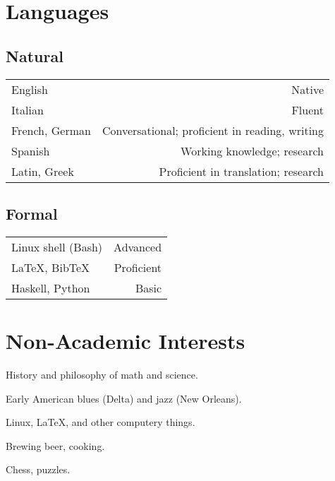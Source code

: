 \documentclass[11pt,letterpaper,twoside]{article}
\makeatletter
\newcommand{\myvrule}{\color{lightgray}\vrule width 1.0pt}
\newenvironment{cvsection}{%
  \renewcommand{\arraystretch}{1.75}
  \begin{longtable}[l]{@{} L R @{}}
}{%
  \end{longtable}
}
\makeatother
\begin{document}
\section*{Languages}

\subsection*{Natural}

\begin{cvsection}
  English & Native \\
  Italian & Fluent \\
  French, German & Conversational; proficient in reading, writing \\
  Spanish & Working knowledge; research \\
  Latin, Greek & Proficient in translation; research \\
\end{cvsection}

\subsection*{Formal}

\begin{cvsection}
  Linux shell {\footnotesize (Bash)} & Advanced \\
  \LaTeX, Bib\TeX{} & Proficient \\
  Haskell, Python & Basic \\
\end{cvsection}

\section*{Non-Academic Interests}

\begin{list}{}{\leftmargin=0pt}
  \item History and philosophy of math and science.
  \item Early American blues (Delta) and jazz (New Orleans).
  \item Linux, \LaTeX{}, and other computery things.
  \item Brewing beer, cooking.
  \item Chess, puzzles.
\end{list}
\end{document}
